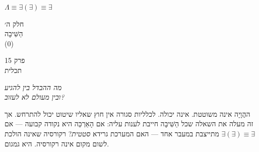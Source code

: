 \documentclass[10pt, openany, oneside]{book}
\renewcommand{\normalsize}{\fontsize{10}{13}\selectfont}
\renewcommand{\large}{\fontsize{11.5}{14}\selectfont}
\renewcommand{\LARGE}{\fontsize{15}{18}\selectfont}
\renewcommand{\huge}{\fontsize{17}{21}\selectfont}
\begin{document}
\vspace{0.5em}

\begin{center}
    $\Lambda \equiv \exists(\exists) \equiv \exists$
\end{center}

%
%

\newpage
\thispagestyle{empty}
\vspace*{\fill}
\begin{center}
    {\LARGE\textsc{חלק ה׳}}\\[1em]
    {\large\textsc{הַשִּׁיבָה}}\\[0.5em]
    {\normalsize (0)}
\end{center}
\vspace*{\fill}
\newpage

%
%
%

\newpage

\begin{center}
    {\huge\textsc{פרק 15}}\\[0.3em]
    {\large\textsc{תכלית}}
\end{center}

\vspace{1.5em}

\begin{center}
    \textit{%
    מה ההבדל בין להגיע\\
    ובין מעולם לא לעזוב?}
\end{center}

\vspace{2em}


\noindent ההֲוָיָה אינה משוטטת. אינה יכולה. לכלליות סגורה אין חוץ שאליו שיטוט יכול להתרחש. אך זה מעלה את השאלה שכל הַשִּׁיבָה חייבת לענות עליה: אם הָאַרְכֵּה היא נקודה קבועה — אם $\exists(\exists) \equiv \exists$ מתייצבת במעבר אחד — האם המערכת גרידא \textit{סטטית}? רקורסיה שאינה הולכת לשום מקום אינה רקורסיה. היא גמגום.
\end{document}
